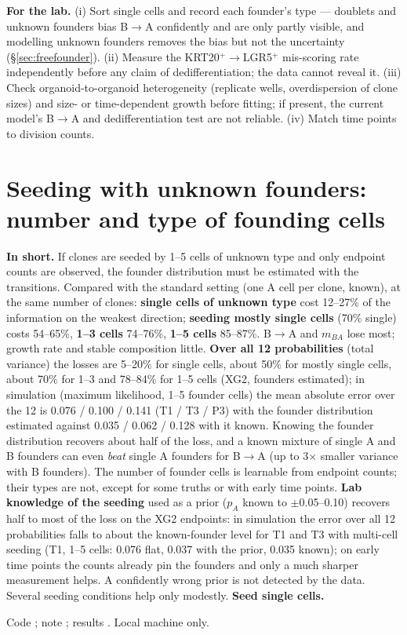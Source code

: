 \documentclass[10pt,a4paper]{article}
\newcommand{\BA}{B$\to$A}
\begin{document}
\textbf{For the lab.} (i) Sort single cells and record each founder's type --- doublets and unknown founders bias \BA{} confidently and are only partly visible, and modelling unknown founders removes the bias but not the uncertainty (\S\ref{sec:freefounder}). (ii) Measure the KRT20$^+$$\to$LGR5$^+$ mis-scoring rate independently before any claim of dedifferentiation; the data cannot reveal it. (iii) Check organoid-to-organoid heterogeneity (replicate wells, overdispersion of clone sizes) and size- or time-dependent growth before fitting; if present, the current model's \BA{} and dedifferentiation test are not reliable. (iv) Match time points to division counts.

\section{Seeding with unknown founders: number and type of founding cells}\label{sec:founders}
\begin{keybox}
\textbf{In short.} If clones are seeded by 1--5 cells of unknown type and only endpoint counts are observed, the founder distribution must be estimated with the transitions. Compared with the standard setting (one A cell per clone, known), at the same number of clones: \textbf{single cells of unknown type} cost 12--27\% of the information on the weakest direction; \textbf{seeding mostly single cells} (70\% single) costs 54--65\%, \textbf{1--3 cells} 74--76\%, \textbf{1--5 cells} 85--87\%. \BA{} and $m_{BA}$ lose most; growth rate and stable composition little. \textbf{Over all 12 probabilities} (total variance) the losses are 5--20\% for single cells, about 50\% for mostly single cells, about 70\% for 1--3 and 78--84\% for 1--5 cells (XG2, founders estimated); in simulation (maximum likelihood, 1--5 founder cells) the mean absolute error over the 12 is 0.076 / 0.100 / 0.141 (T1 / T3 / P3) with the founder distribution estimated against 0.035 / 0.062 / 0.128 with it known. Knowing the founder distribution recovers about half of the loss, and a known mixture of single A and B founders can even \emph{beat} single A founders for \BA{} (up to 3$\times$ smaller variance with B founders). The number of founder cells is learnable from endpoint counts; their types are not, except for some truths or with early time points. \textbf{Lab knowledge of the seeding} used as a prior ($p_A$ known to $\pm$0.05--0.10) recovers half to most of the loss on the XG2 endpoints: in simulation the error over all 12 probabilities falls to about the known-founder level for T1 and T3 with multi-cell seeding (T1, 1--5 cells: 0.076 flat, 0.037 with the prior, 0.035 known); on early time points the counts already pin the founders and only a much sharper measurement helps. A confidently wrong prior is not detected by the data. Several seeding conditions help only modestly. \textbf{Seed single cells.}
\end{keybox}
Code ; note ; results . Local machine only.
\end{document}
